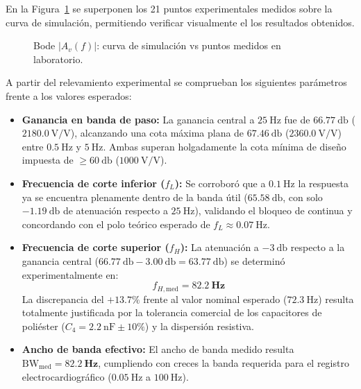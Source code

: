 En la Figura~\ref{fig:sim_bode_pgf} se superponen los 21 puntos experimentales
medidos  sobre la curva de simulación, permitiendo verificar visualmente el
los resultados obtenidos.

\begin{figure}[!ht]
  \centering
  \caption{Bode $|A_v(f)|$: curva de simulación vs puntos medidos en laboratorio.}
  \label{fig:sim_bode_pgf}
\end{figure}

A partir del relevamiento experimental se comprueban los siguientes parámetros frente a los valores esperados:
\begin{itemize}
  \item \textbf{Ganancia en banda de paso:} La ganancia central a $\SI{25}{\hertz}$ fue de $\SI{66.77}{\decibel}$ ($2180.0\ \text{V/V}$), alcanzando una cota máxima plana de $\SI{67.46}{\decibel}$ ($2360.0\ \text{V/V}$) entre $\SI{0.5}{\hertz}$ y $\SI{5}{\hertz}$. Ambas superan holgadamente la cota mínima de diseño impuesta de $\ge \SI{60}{\decibel}$ ($1000\ \text{V/V}$).
  \item \textbf{Frecuencia de corte inferior ($f_L$):} Se corroboró que a $\SI{0.1}{\hertz}$ la respuesta ya se encuentra plenamente dentro de la banda útil ($\SI{65.58}{\decibel}$, con solo $-\SI{1.19}{\decibel}$ de atenuación respecto a $\SI{25}{\hertz}$), validando el bloqueo de continua y concordando con el polo teórico esperado de $f_L \approx \SI{0.07}{\hertz}$.
  \item \textbf{Frecuencia de corte superior ($f_H$):} La atenuación a $-\SI{3}{\decibel}$ respecto a la ganancia central ($\SI{66.77}{\decibel} - \SI{3.00}{\decibel} = \SI{63.77}{\decibel}$) se determinó experimentalmente en:
  \begin{equation*}
    f_{H,\text{med}} = \mathbf{\SI{82.2}{\hertz}}
  \end{equation*}
  La discrepancia del $+13.7\%$ frente al valor nominal esperado ($\SI{72.3}{\hertz}$) resulta totalmente justificada por la tolerancia comercial de los capacitores de poliéster ($C_4 = \SI{2.2}{\nano\farad} \pm 10\%$) y la dispersión resistiva.
  \item \textbf{Ancho de banda efectivo:} El ancho de banda medido resulta $\text{BW}_{\text{med}} = \mathbf{\SI{82.2}{\hertz}}$, cumpliendo con creces la banda requerida para el registro electrocardiográfico ($\SI{0.05}{\hertz}$ a $\SI{100}{\hertz}$).
\end{itemize}

\clearpage
